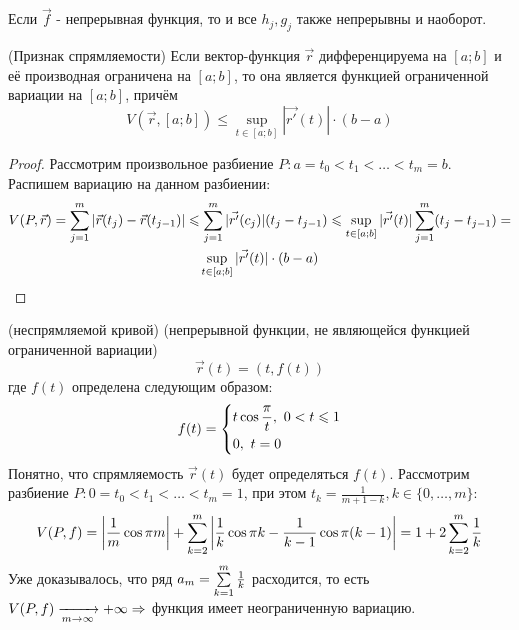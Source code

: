 \begin{note}
	Если $\vec{f}$ - непрерывная функция, то и все $h_j, g_j$ также непрерывны и наоборот.
\end{note}

\begin{lemma} (Признак спрямляемости)
	Если вектор-функция $\vec{r}$ дифференцируема на $[a; b]$ и её производная ограничена на $[a; b]$, то она является функцией ограниченной вариации на $[a; b]$, причём
	\[
		V(\vec{r}, [a; b]) \le \sup\limits_{t \in [a; b]} |\vec{r'}(t)| \cdot (b - a)
	\]
\end{lemma}

\begin{proof}
	Рассмотрим произвольное разбиение $P: a = t_0 < t_1 < \ldots < t_m = b$. Распишем вариацию на данном разбиении:
	\begin{multline*}
		V(P, \vec{r}) = \sum\limits_{j = 1}^m |\vec{r}(t_j) - \vec{r}(t_{j - 1})| \leqslant \sum\limits_{j = 1}^m |\vec{r'}(c_j)|(t_j - t_{j - 1}) \leqslant \sup\limits_{t \in [a; b]} |\vec{r'}(t)| \sum\limits_{j = 1}^m (t_j - t_{j - 1}) =
		\\
		\sup\limits_{t \in [a; b]} |\vec{r'}(t)| \cdot (b - a)
	\end{multline*}
\end{proof}

\begin{example} (неспрямляемой кривой) (непрерывной функции, не являющейся функцией ограниченной вариации)
	\[
		\vec{r}(t) = (t, f(t))
	\]
	где $f(t)$ определена следующим образом:
	\[
		f(t) = \left\{\begin{aligned}
			&{t\cos \frac{\pi}{t},\ 0 < t \leqslant 1}
			\\
			&{0,\ t = 0}
		\end{aligned}\right.
	\]
	Понятно, что спрямляемость $\vec{r}(t)$ будет определяться $f(t)$. Рассмотрим разбиение $P: 0 = t_0 < t_1 < \ldots < t_m = 1$, при этом $t_k = \frac{1}{m + 1 - k}, k \in \{0, \ldots, m\}$:
	\[
		V(P, f) = \left|\frac{1}{m} \cos \pi m\right| + \sum\limits_{k = 2}^m \left|\frac{1}{k}\cos \pi k - \frac{1}{k - 1} \cos \pi (k - 1)\right| = 1 + 2\sum\limits_{k = 2}^m \frac{1}{k}
	\]
	Уже доказывалось, что ряд $a_m = \sum\limits_{k = 1}^m \frac{1}{k}$ расходится, то есть $V(P, f) \xrightarrow[m \to \infty]{} +\infty \Rightarrow$ функция имеет неограниченную вариацию.
\end{example}